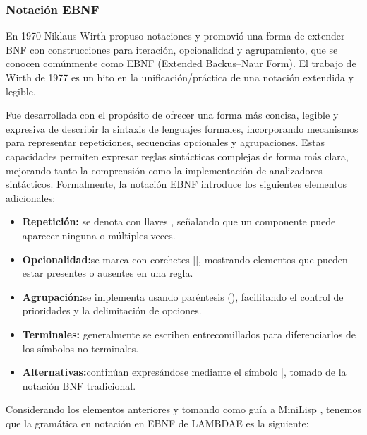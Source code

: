 \documentclass[a4paper,12pt]{article}
\begin{document}
\subsubsection{Notación EBNF}
En 1970 Niklaus Wirth propuso notaciones y promovió una forma de extender BNF con construcciones para iteración, opcionalidad y agrupamiento, que se conocen comúnmente como EBNF (Extended Backus–Naur Form). El trabajo de Wirth de 1977 es un hito en la unificación/práctica de una notación extendida y legible.\cite{Winskel93}

Fue desarrollada con el propósito
de ofrecer una forma más concisa, legible y expresiva de describir la sintaxis de lenguajes
formales, incorporando mecanismos para representar repeticiones, secuencias opcionales y
agrupaciones. Estas capacidades permiten expresar reglas sintácticas complejas de forma más clara, mejorando tanto la comprensión como la implementación de analizadores sintácticos. Formalmente, la notación EBNF introduce los siguientes elementos adicionales:\cite{LambdaSpace04,UNAMMaterial}


\begin{itemize}
    \item \textbf{Repetición:} se denota con llaves {}, señalando que un componente puede aparecer ninguna o múltiples veces.
    \item \textbf{Opcionalidad:}se marca con corchetes [], mostrando elementos que pueden estar presentes o ausentes en una regla.
    \item \textbf{Agrupación:}se implementa usando paréntesis (), facilitando el control de prioridades y la delimitación de opciones.
    \item \textbf{Terminales:} generalmente se escriben entrecomillados para diferenciarlos de los símbolos no terminales.
    \item \textbf{Alternativas:}continúan expresándose mediante el símbolo |, tomado de la notación BNF tradicional.\cite{UNAMTesis,UNAMMaterial,Dragon}
\end{itemize}

Considerando los elementos anteriores y tomando como guía a MiniLisp , tenemos que la gramática en notación en EBNF de LAMBDAE es la siguiente:
\end{document}
